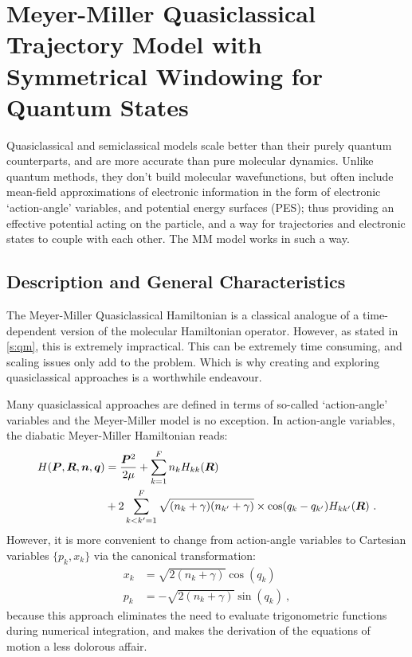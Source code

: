 \section{Meyer-Miller Quasiclassical Trajectory Model with Symmetrical Windowing for Quantum States}
%
Quasiclassical and semiclassical models scale better than their purely quantum counterparts, and are more accurate than pure molecular dynamics. Unlike quantum methods, they don't build molecular wavefunctions, but often include mean-field approximations of electronic information in the form of electronic `action-angle' variables, and potential energy surfaces (PES); thus providing an effective potential acting on the particle, and a way for trajectories and electronic states to couple with each other. The MM model works in such a way.
%
\subsection{Description and General Characteristics}
%
The Meyer-Miller Quasiclassical Hamiltonian is a classical analogue of a time-dependent version of the molecular Hamiltonian operator. However, as stated in \cref{s:qm}, this is extremely impractical. This can be extremely time consuming, and scaling issues only add to the problem. Which is why creating and exploring quasiclassical approaches is a worthwhile endeavour.

Many quasiclassical approaches are defined in terms of so-called `action-angle' variables and the Meyer-Miller model is no exception. In action-angle variables, the diabatic Meyer-Miller Hamiltonian \cite{project} reads:
\begin{align}\label{eq:aaham}
H(\bm{P},\bm{R},\bm{n},\bm{q}) &= \frac{\bm{P}^{2}}{2 \mu} + \sum\limits_{k=1}^{F} n_{k} H_{kk}(\bm{R}) \nonumber\\
& + 2 \sum\limits_{k<k'=1}^{F} \sqrt{(n_{k}+\gamma)(n_{k'}+\gamma)} \times \cos(q_{k}-q_{k'})H_{kk'}(\bm{R})~.
\end{align}
However, it is more convenient to change from action-angle variables to Cartesian variables $ \{p_{k},x_{k}\} $ via the canonical transformation:
\begin{subequations}\label{eq:aatocar}
\begin{align}
x_{k} &= \sqrt{2(n_{k} + \gamma)} \cos(q_{k})\\
p_{k} &= -\sqrt{2(n_{k} + \gamma)} \sin(q_{k})~,
\end{align}
\end{subequations}
because this approach eliminates the need to evaluate trigonometric functions during numerical integration, and makes the derivation of the equations of motion a less dolorous affair.


